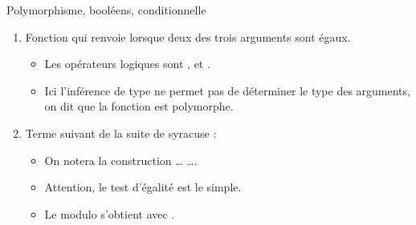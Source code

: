 \documentclass[10pt]{beamer}
\begin{document}
\begin{frame}{\Ctitle}{\stitle}
	\begin{exampleblock}{Polymorphisme, booléens, conditionnelle}
		\begin{enumerate}
			\item<1-> Fonction qui renvoie  lorsque deux  des trois arguments sont égaux.
				\begin{itemize}
					\item<2-> Les opérateurs logiques sont \kw{\&\&}, \kw{||} et .
					\item<3-> Ici l'inférence de type ne permet pas de déterminer le type des arguments, on dit que la fonction est \textcolor{BrickRed}{polymorphe}.
				\end{itemize}
            \item<4-> Terme suivant de la suite de syracuse :
            \begin{itemize}
                \item<5-> On notera la construction  \dots {} \dots {}.
                \item<6-> Attention, le test d'égalité est le \kw{=} simple.
                \item<7-> Le modulo s'obtient avec .
            \end{itemize}
		\end{enumerate}
	\end{exampleblock}
\end{frame}
\end{document}

